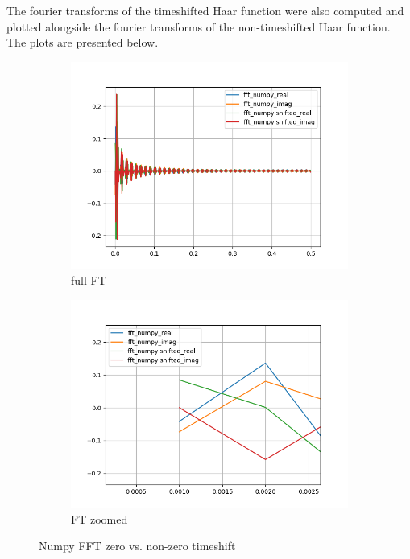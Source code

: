 \documentclass[12pt]{article}
\begin{document}
The fourier transforms of the timeshifted Haar function were also computed and plotted alongside the fourier transforms of the non-timeshifted Haar function. The plots are presented below.
\begin{figure}[h]
	\centering
	\begin{subfigure}[h]{0.40\textwidth}
		\centering
		\includegraphics[width=\textwidth]{freq_domain_numpy_final_nozoom.png}
		\caption{full FT}
	\end{subfigure}
	\begin{subfigure}[h]{0.40\textwidth}
		\centering
		\includegraphics[width=\textwidth]{freq_domain_numpy_final_zoom.png}
		\caption{FT zoomed}
	\end{subfigure}
	\caption{Numpy FFT zero vs. non-zero timeshift}
\end{figure}
\end{document}
